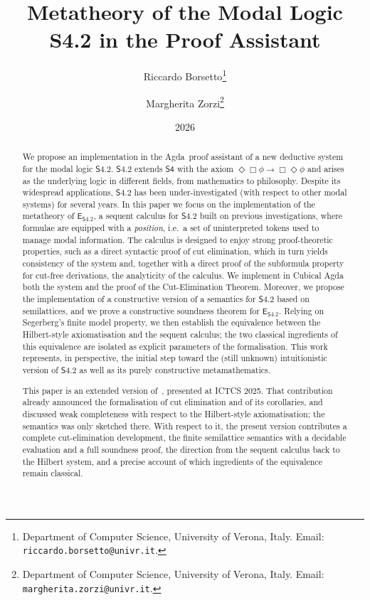 \documentclass{article}
\title{Metatheory of the Modal Logic S4.2 in the \agda{} Proof Assistant}
\author{
  Riccardo Borsetto\thanks{Department of Computer Science, University of Verona, Italy.
    Email: \texttt{riccardo.borsetto@univr.it}.} \and
  Margherita Zorzi\thanks{Department of Computer Science, University of Verona, Italy.
    Email: \texttt{margherita.zorzi@univr.it}.}
}
\date{2026}
\newcommand{\logic}{\mathsf{S4.2}}
\newcommand{\axname}[1]{\mathsf{#1}}
\newcommand{\agda}{\textsf{Agda}}
\newcommand{\cubical}{\textsf{Cubical Agda}}
\theoremstyle{definition}
\begin{document}
\maketitle

\begin{abstract}
    We propose an implementation in the \agda{}~proof assistant of a new deductive system for the modal logic $\logic$. $\logic$ extends $\axname{S4}$ with the axiom $\Diamond\Box\phi \rightarrow \Box\Diamond\phi$ and arises as the underlying logic in different fields, from mathematics to philosophy.
    Despite its widespread applications, $\logic$ has been under-investigated (with respect to other modal systems) for several years. In this paper we focus on the implementation of the metatheory of $\mathsf{E}_{\logic}$, a sequent calculus for $\logic$ built on previous investigations, where formulae are equipped with a \emph{position}, i.e.\ a set of uninterpreted tokens used to manage modal information. The calculus is designed to enjoy strong proof-theoretic properties, such as a direct syntactic proof of cut elimination, which in turn yields consistency of the system and, together with a direct proof of the subformula property for cut-free derivations, the analyticity of the calculus. We implement in \cubical{} both the system and the proof of the Cut-Elimination Theorem. Moreover, we propose the implementation of a constructive version of a semantics for $\logic$ based on semilattices, and we prove a constructive soundness theorem for $\mathsf{E}_{\logic}$. Relying on Segerberg's finite model property, we then establish the equivalence between the Hilbert-style axiomatisation and the sequent calculus; the two classical ingredients of this equivalence are isolated as explicit parameters of the formalisation.
    This work represents, in perspective, the initial step toward the (still unknown) intuitionistic version of $\logic$ as well as its purely constructive metamathematics.

    This paper is an extended version of~\cite{Borsetto2025:S42Investigations}, presented at ICTCS 2025. That contribution already announced the formalisation of cut elimination and of its corollaries, and discussed weak completeness with respect to the Hilbert-style axiomatisation; the semantics was only sketched there. With respect to it, the present version contributes a complete cut-elimination development, the finite semilattice semantics with a decidable evaluation and a full soundness proof, the direction from the sequent calculus back to the Hilbert system, and a precise account of which ingredients of the equivalence remain classical.
\end{abstract}
\end{document}
